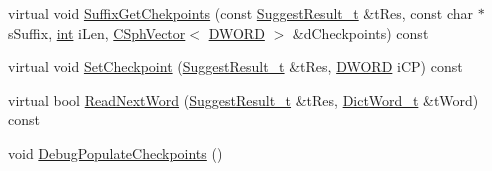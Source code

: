 \begin{DoxyCompactItemize}
\item 
virtual void \hyperlink{classCWordlist_a38b80f7f41d3f7519e89d99bb547a734}{Suffix\-Get\-Chekpoints} (const \hyperlink{structSuggestResult__t}{Suggest\-Result\-\_\-t} \&t\-Res, const char $\ast$s\-Suffix, \hyperlink{sphinxexpr_8cpp_a4a26e8f9cb8b736e0c4cbf4d16de985e}{int} i\-Len, \hyperlink{classCSphVector}{C\-Sph\-Vector}$<$ \hyperlink{sphinxstd_8h_a798af1e30bc65f319c1a246cecf59e39}{D\-W\-O\-R\-D} $>$ \&d\-Checkpoints) const 
\item 
virtual void \hyperlink{classCWordlist_a2712a9b65d2def207f8fbcf451f6723c}{Set\-Checkpoint} (\hyperlink{structSuggestResult__t}{Suggest\-Result\-\_\-t} \&t\-Res, \hyperlink{sphinxstd_8h_a798af1e30bc65f319c1a246cecf59e39}{D\-W\-O\-R\-D} i\-C\-P) const 
\item 
virtual bool \hyperlink{classCWordlist_ada851fcce9f2e150ea48370ffa7f7e8f}{Read\-Next\-Word} (\hyperlink{structSuggestResult__t}{Suggest\-Result\-\_\-t} \&t\-Res, \hyperlink{structISphWordlistSuggest_1_1DictWord__t}{Dict\-Word\-\_\-t} \&t\-Word) const 
\item 
void \hyperlink{classCWordlist_a5ed392944f37ab2c1acd0ab82b447289}{Debug\-Populate\-Checkpoints} ()
\end{DoxyCompactItemize}
